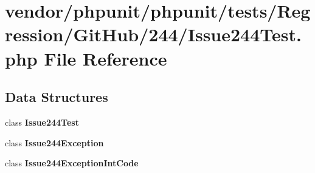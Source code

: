 \section{vendor/phpunit/phpunit/tests/\+Regression/\+Git\+Hub/244/\+Issue244\+Test.php File Reference}
\label{_issue244_test_8php}
\subsection*{Data Structures}
\begin{DoxyCompactItemize}
\item 
class {\bf Issue244\+Test}
\item 
class {\bf Issue244\+Exception}
\item 
class {\bf Issue244\+Exception\+Int\+Code}
\end{DoxyCompactItemize}
